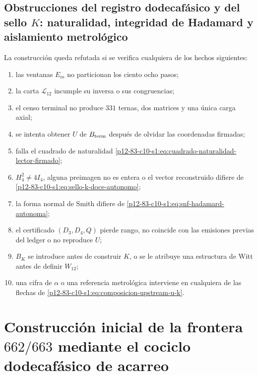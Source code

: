 \subsection{Obstrucciones del registro dodecafásico y del sello \(K\): naturalidad, integridad de Hadamard y aislamiento metrológico}

\begin{criterion}
La construcción queda refutada si se verifica cualquiera de los hechos
siguientes:
\begin{enumerate}
 \item las ventanas \(E_m\) no particionan los ciento ocho pasos;
 \item la carta \(\mathcal L_{12}\) incumple su inversa o sus congruencias;
 \item el censo terminal no produce \(331\) ternas, dos matrices y una única
       carga axial;
 \item se intenta obtener \(U\) de \(B_{\rm term}\) después de olvidar las
       coordenadas firmadas;
 \item falla el cuadrado de naturalidad
       \eqref{p12-83-c10-s1:eq:cuadrado-naturalidad-lector-firmado};
 \item \(H_4^2\neq4I_4\), alguna preimagen no es entera o el vector
       reconstruido difiere de \eqref{p12-83-c10-s1:eq:sello-k-doce-autonomo};
 \item la forma normal de Smith difiere de
       \eqref{p12-83-c10-s1:eq:snf-hadamard-autonoma};
 \item el certificado \((D_3,D_4,Q)\) pierde rango, no coincide con las
       emisiones previas del ledger o no reproduce \(U\);
 \item \(B_K\) se introduce antes de construir \(K\), o se le atribuye una
       estructura de Witt antes de definir \(W_{12}\);
 \item una cifra de \(\alpha\) o una referencia metrológica interviene en
       cualquiera de las flechas de \eqref{p12-83-c10-s1:eq:composicion-upstream-u-k}.
\end{enumerate}
\end{criterion}



\section{Construcción inicial de la frontera \texorpdfstring{\(662/663\)}{662/663} mediante el cociclo dodecafásico de acarreo}
\label{p12-83-c10-s2:chap:acarreo-alpha-frontera-662-663}

